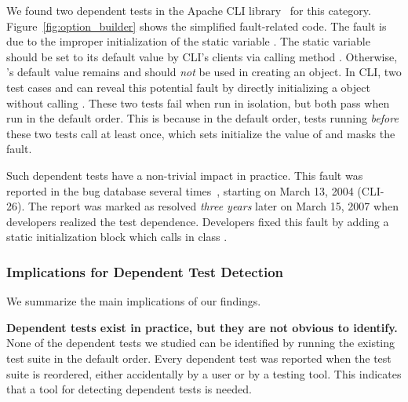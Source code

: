 We found two dependent tests in
the Apache CLI library~\cite{cli} for this category.
Figure~\ref{fig:option_builder} shows the simplified fault-related
code. The fault is due to the improper initialization of the static variable
. The static variable  should be set
to its default value  by CLI's clients via calling
method . Otherwise, 's
default value remains  and should \emph{not} be
used in creating an  object.
In CLI, two test cases 
 and 
can reveal this potential fault by directly initializing
a  object without calling .
These two tests fail when run in isolation,
but both pass when run in the default order. This is because
in the default order, tests running \emph{before} these
two tests call  at least once, which sets
initialize the value of  and masks the fault.


Such dependent tests have a non-trivial impact in practice.
This fault was reported in the bug database several times~\cite{clibug},
starting on March 13, 2004 (CLI-26). The report was marked as resolved
\emph{three years} later on March 15, 2007 when developers
realized the test dependence. Developers fixed this
fault by adding a static initialization block which
calls  in class .



\subsubsection{Implications for Dependent Test Detection}

We summarize the main implications of our findings.

\noindent \textbf{{Dependent tests exist in practice, but
they are not obvious to identify.}}
None of the dependent tests we studied can be identified by
running the existing test suite in the default order. 
Every dependent test was reported when the
test suite is reordered, either accidentally by a user or
by a testing tool. This indicates that
a tool for detecting dependent tests is needed.

